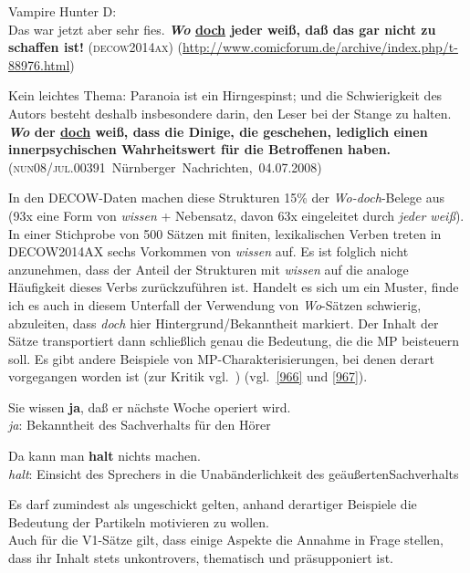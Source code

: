 {\begin{exe}
	\ex\label{964}

	Vampire Hunter D:\\
	Das war jetzt aber sehr fies. \textbf{\textit{Wo} \ul{doch} jeder weiß, daß das gar nicht zu schaffen ist!}		
	\hfill\hbox{\scshape(decow2014ax)}
	\newline
	{\scriptsize(\url{http://www.comicforum.de/archive/index.php/t-88976.html})}
\end{exe}				               

\begin{exe}
	\ex\label{965}

	Kein leichtes Thema: Paranoia ist ein Hirngespinst; und die Schwierigkeit des Autors besteht deshalb insbesondere darin, den Leser bei der Stange zu 		halten. \textbf{\textit{Wo} der \ul{doch} weiß, dass die Dinige, die geschehen, lediglich einen innerpsychischen Wahrheitswert für die 				Betroffenen haben.}
	\newline
	\hbox{}\hfill\hbox{(\textsc{nun08/jul.00391} Nürnberger Nachrichten, 04.07.2008)}
\end{exe}				               		                            
In den DECOW-Daten machen diese Strukturen 15\% der \textit{Wo-doch}-Belege aus (93x eine Form von \textit{wissen} + Nebensatz, davon 63x eingeleitet durch \textit{jeder weiß}). In einer Stichprobe von 500 Sätzen mit finiten, lexikalischen Verben treten in DECOW2014AX sechs Vorkommen von \textit{wissen} auf. Es ist folglich nicht anzunehmen, dass der Anteil der Strukturen mit \textit{wissen} auf die analoge Häufigkeit dieses Verbs zurückzuführen ist. Handelt es sich um ein Muster, finde ich es auch in diesem Unterfall der Verwendung von \textit{Wo}-Sätzen schwierig, abzuleiten, dass \textit{doch} hier Hintergrund/Bekanntheit  markiert. Der Inhalt der Sätze transportiert dann schließ\-lich genau die Bedeutung, die die MP beisteuern soll. Es gibt andere Beispiele von MP-Charakterisierungen, bei denen derart vorgegangen worden ist (zur Kritik vgl.\ \citealt[380]{Ickler1994}) (vgl.\ \ref{966} und \ref{967}).

\begin{exe}
	\ex\label{966}
	Sie wissen \textbf{ja}, daß er nächste Woche operiert wird.\\
	\textit{ja}: Bekanntheit des Sachverhalts für den Hörer
\end{exe}	

\begin{exe}
	\ex\label{967}
	Da kann man \textbf{halt} nichts machen.\\
	\textit{halt}: Einsicht des Sprechers in die Unabänderlichkeit des geäußerten\linebreak Sachverhalts
	\hfill\hbox{\citet[380]{Ickler1994}}
\end{exe}
Es darf zumindest als ungeschickt gelten, anhand derartiger Beispiele die Bedeutung der Partikeln motivieren zu wollen.\\
\newline
\noindent
Auch für die V1-Sätze gilt, dass einige Aspekte die Annahme in Frage stellen, dass ihr Inhalt stets unkontrovers, thematisch und präsupponiert ist.

}
